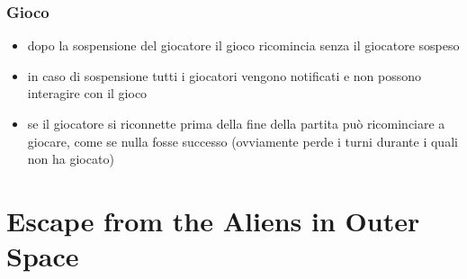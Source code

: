 \documentclass{beamer}
\begin{document}
\begin{frame}
\frametitle{Gioco}
\begin{itemize}
\item dopo la sospensione del giocatore il gioco ricomincia senza il
  giocatore sospeso
\item in caso di sospensione tutti i giocatori vengono notificati e
  non possono interagire con il gioco 
\item se il giocatore si riconnette prima della fine della partita
  pu\`o ricominciare a giocare, come se nulla fosse successo
  (ovviamente perde i turni durante i quali non ha giocato)
\end{itemize}
\end{frame}


{
%
\section{Escape from the Aliens in Outer Space}
\begin{frame}[plain]


\end{frame}
}
\end{document}

